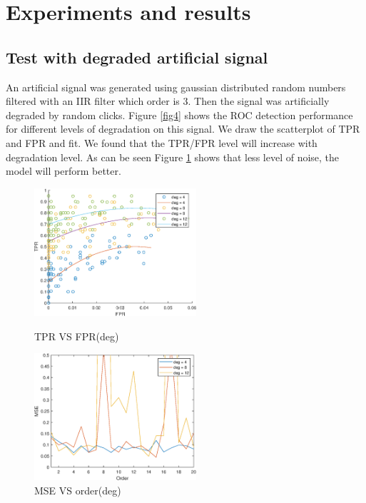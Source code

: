 \documentclass[11pt, a4paper]{article}
\begin{document}



\section{Experiments and results}
\subsection{Test with degraded artificial signal}
An artificial signal was generated using gaussian distributed random numbers filtered with an IIR filter which order is 3. Then the signal was artificially degraded by random clicks. Figure \ref{fig4} shows the ROC detection performance for different levels of degradation on this signal. We draw the scatterplot of TPR and FPR and fit. We found that the TPR/FPR level will increase with degradation level. As can be seen Figure \ref{fig5} shows that less level of noise, the model will perform better.

\begin{figure}[htbp]
	\centering
	\begin{minipage}[t]{0.48\textwidth}
		\centering
		\includegraphics[width=6cm]{fig/fig4}
		\caption{TPR VS FPR(deg)}
		\label{fig4}
	\end{minipage}
	\begin{minipage}[t]{0.48\textwidth}
		\centering
		\includegraphics[width=6cm]{fig/fig5}
		\caption{MSE VS order(deg)}
		\label{fig5}
	\end{minipage}
\end{figure}
\end{document}
